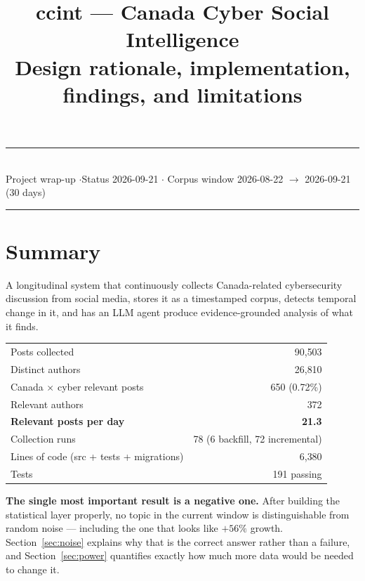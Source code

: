\documentclass[11pt]{article}
\title{\vspace{-2.2em}\textbf{ccint --- Canada Cyber Social Intelligence}\\[0.35em]
\large\normalfont Design rationale, implementation, findings, and limitations}
\author{}
\date{}
\begin{document}
\maketitle
\vspace{-3.5em}

\begin{center}
\small\textcolor{accent}{\rule{\textwidth}{0.8pt}}\\[0.5em]
Project wrap-up \quad$\cdot$\quad Status 2026-09-21 \quad$\cdot$\quad
Corpus window 2026-08-22 $\to$ 2026-09-21 (30 days)\\[0.3em]
\textcolor{accent}{\rule{\textwidth}{0.8pt}}
\end{center}
\vspace{0.8em}

\section*{Summary}

A longitudinal system that continuously collects Canada-related cybersecurity
discussion from social media, stores it as a timestamped corpus, detects
temporal change in it, and has an LLM agent produce evidence-grounded analysis
of what it finds.

\begin{center}
\begin{tabular}{@{}lr@{}}
\toprule
Posts collected & 90{,}503 \\
Distinct authors & 26{,}810 \\
Canada $\times$ cyber relevant posts & 650 (0.72\%) \\
Relevant authors & 372 \\
\textbf{Relevant posts per day} & \textbf{21.3} \\
Collection runs & 78 (6 backfill, 72 incremental) \\
Lines of code (src + tests + migrations) & 6{,}380 \\
Tests & 191 passing \\
\bottomrule
\end{tabular}
\end{center}

\begin{keybox}
\textbf{The single most important result is a negative one.} After building the
statistical layer properly, no topic in the current window is distinguishable
from random noise --- including the one that looks like $+56\%$ growth.
Section~\ref{sec:noise} explains why that is the correct answer rather than a
failure, and Section~\ref{sec:power} quantifies exactly how much more data
would be needed to change it.
\end{keybox}
\end{document}
